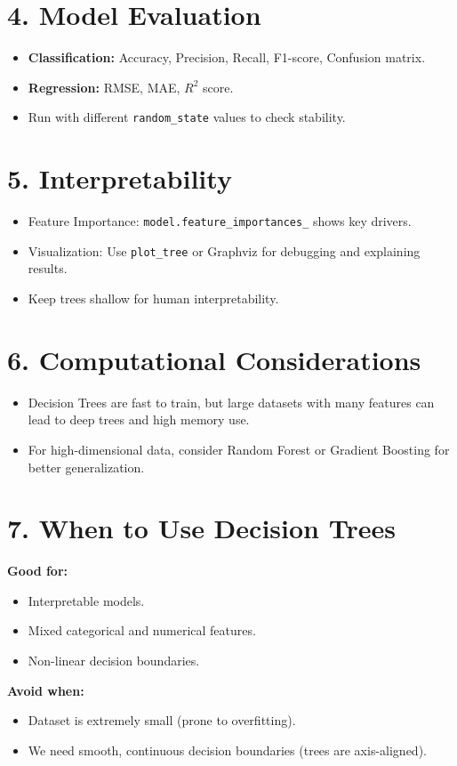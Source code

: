 \documentclass[11pt,a4paper]{article}
\begin{document}
\section*{4. Model Evaluation}
\begin{itemize}[leftmargin=1.5em]
    \item \textbf{Classification:} Accuracy, Precision, Recall, F1-score, Confusion matrix.
    \item \textbf{Regression:} RMSE, MAE, $R^2$ score.
    \item Run with different \texttt{random\_state} values to check stability.
\end{itemize}

\section*{5. Interpretability}
\begin{itemize}[leftmargin=1.5em]
    \item Feature Importance: \texttt{model.feature\_importances\_} shows key drivers.
    \item Visualization: Use \texttt{plot\_tree} or Graphviz for debugging and explaining results.
    \item Keep trees shallow for human interpretability.
\end{itemize}

\section*{6. Computational Considerations}
\begin{itemize}[leftmargin=1.5em]
    \item Decision Trees are fast to train, but large datasets with many features can lead to deep trees and high memory use.
    \item For high-dimensional data, consider Random Forest or Gradient Boosting for better generalization.
\end{itemize}

\section*{7. When to Use Decision Trees}
\textbf{Good for:}
\begin{itemize}[leftmargin=1.5em]
    \item Interpretable models.
    \item Mixed categorical and numerical features.
    \item Non-linear decision boundaries.
\end{itemize}

\textbf{Avoid when:}
\begin{itemize}[leftmargin=1.5em]
    \item Dataset is extremely small (prone to overfitting).
    \item We need smooth, continuous decision boundaries (trees are axis-aligned).
\end{itemize}
\end{document}
